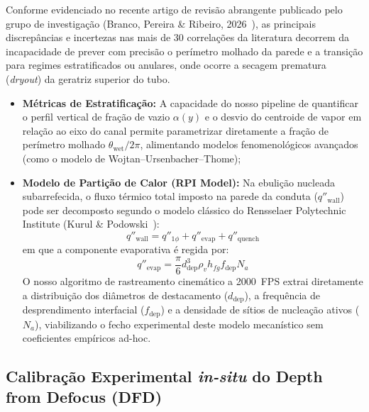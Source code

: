 Conforme evidenciado no recente artigo de revisão abrangente publicado pelo grupo de investigação (Branco, Pereira \& Ribeiro, 2026~\cite{branco2026flow}), as principais discrepâncias e incertezas nas mais de 30 correlações da literatura decorrem da incapacidade de prever com precisão o perímetro molhado da parede e a transição para regimes estratificados ou anulares, onde ocorre a secagem prematura (\emph{dryout}) da geratriz superior do tubo.
\begin{itemize}
    \item \textbf{Métricas de Estratificação:} A capacidade do nosso pipeline de quantificar o perfil vertical de fração de vazio $\alpha(y)$ e o desvio do centroide de vapor em relação ao eixo do canal permite parametrizar diretamente a fração de perímetro molhado $\theta_{\text{wet}} / 2\pi$, alimentando modelos fenomenológicos avançados (como o modelo de Wojtan--Ursenbacher--Thome);
    \item \textbf{Modelo de Partição de Calor (RPI Model):} Na ebulição nucleada subarrefecida, o fluxo térmico total imposto na parede da conduta ($q''_{\text{wall}}$) pode ser decomposto segundo o modelo clássico do Rensselaer Polytechnic Institute (Kurul \& Podowski~\cite{seong2023automated}):
    \begin{equation}
        q''_{\text{wall}} = q''_{1\phi} + q''_{\text{evap}} + q''_{\text{quench}}
    \end{equation}
    em que a componente evaporativa é regida por:
    \begin{equation}
        q''_{\text{evap}} = \frac{\pi}{6} d_{\text{dep}}^3 \rho_v h_{fg} f_{\text{dep}} N_a
    \end{equation}
    O nosso algoritmo de rastreamento cinemático a 2000~FPS extrai diretamente a distribuição dos diâmetros de destacamento ($d_{\text{dep}}$), a frequência de desprendimento interfacial ($f_{\text{dep}}$) e a densidade de sítios de nucleação ativos ($N_a$), viabilizando o fecho experimental deste modelo mecanístico sem coeficientes empíricos ad-hoc.
\end{itemize}

\subsection{Calibração Experimental \emph{in-situ} do Depth from Defocus (DFD)}
\label{subsec:calibracao_dfd_futura}


